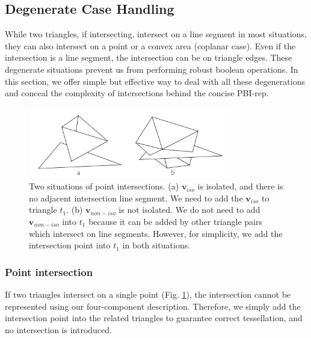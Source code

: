 \documentclass[10pt,journal,compsoc]{IEEEtran}
\begin{document}
\subsection{Degenerate Case Handling}
\label{sec:degenerate}

While two triangles, if intersecting, intersect on a line segment in most situations, they can also intersect on a point or a convex area (coplanar case). Even if the intersection is a line segment, the intersection can be on triangle edges. These degenerate situations prevent us from performing robust boolean operations. In this section, we offer simple but effective way to deal with all these degenerations and conceal the complexity of intersections behind the concise PBI-rep.

\begin{figure}[t]
\centering
\includegraphics[width=3.5in]{isolated}
\caption{Two situations of point intersections. (a) $\bm{v}_{iso}$ is isolated, and there is no adjacent intersection line segment. We need to add the $\bm{v}_{iso}$ to triangle $t_1$. (b) $\bm{v}_{non-iso}$ is not isolated. We do not need to add $\bm{v}_{non-iso}$ into $t_1$ because it can be added by other triangle pairs which intersect on line segments. However, for simplicity, we add the intersection point into $t_1$ in both situations.}
\label{fig:isolated}
\end{figure}

\subsubsection{Point intersection}
\label{sec:ipoint}
If two triangles intersect on a single point (Fig. \ref{fig:isolated}), the intersection cannot be represented using our four-component description. Therefore, we simply add the intersection point into the related triangles to guarantee correct tessellation, and no intersection is introduced.
\end{document}
